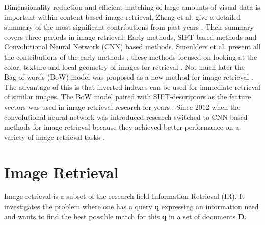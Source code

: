 \documentclass{article}
\begin{document}
Dimensionality reduction and efficient matching of large amounts of visual data is important within content based image retrieval, Zheng et al. give a detailed summary of the most significant contributions from past years \cite{zheng2018sift}. Their summary covers three periods in image retrieval: Early methods, SIFT-based methods and Convolutional Neural Network (CNN) based methods. Smeulders et al. present all the contributions of the early methods \cite{smeulders2000content}, these methods focused on looking at the color, texture and local geometry of images for retrieval \cite{yu2002color,manjunath1996texture}. Not much later the Bag-of-words (BoW) model was proposed as a new method for image retrieval \cite{sivic2003video}. The advantage of this is that inverted indexes can be used for immediate retrieval of similar images. The BoW model paired with SIFT-descriptors \cite{lowe2004distinctive} as the feature vectors was used in image retrieval research for years \cite{nister2006scalable,philbin2007object,jegou2008hamming,jegou2010aggregating,jegou2012aggregating}. Since 2012 when the convolutional neural network was introduced \cite{krizhevsky2012imagenet} research switched to CNN-based methods for image retrieval because they achieved better performance on a variety of image retrieval tasks	 \cite{babenko2014neural,yue2015exploiting, tolias2015particular}.

\section{Image Retrieval} \label{section:imageretrieval}
Image retrieval is a subset of the research field Information Retrieval (IR). It investigates the problem where one has a query \textbf{q} expressing an information need and wants to find the best possible match for this \textbf{q} in a set of documents \textbf{D}.
\end{document}
